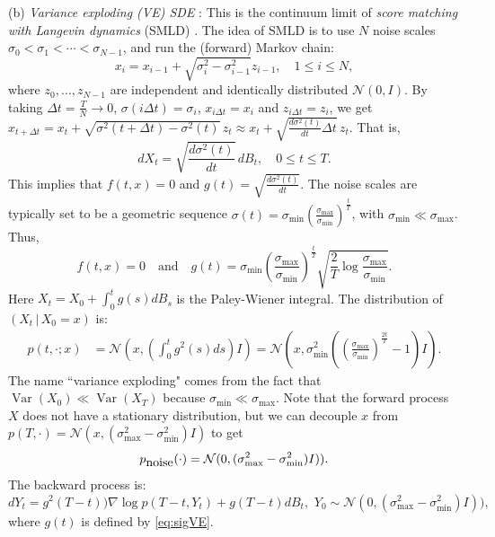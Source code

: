 \documentclass[letterpaper,11pt,reqno]{amsart}
\DeclareMathOperator\var{Var}
\numberwithin{equation}{section}
\begin{document}
\noindent
(b) {\em Variance exploding (VE) SDE} \cite{Song20}: 
This is the continuum limit of {\em score matching with Langevin dynamics} (SMLD) \cite{Song19}.
The idea of SMLD is to use $N$ noise scales $\sigma_0 < \sigma_1 < \cdots < \sigma_{N-1}$, 
and run the (forward) Markov chain:
\begin{equation*}
x_i = x_{i-1} + \sqrt{\sigma_i^2 - \sigma_{i-1}^2} z_{i-1}, \quad 1 \le i \le N,
\end{equation*}
where $z_0, \ldots, z_{N-1}$ are independent and identically distributed $\mathcal{N}(0, I)$.
By taking $\Delta t = \frac{T}{N} \to 0$,  $\sigma(i\Delta t) = \sigma_i$, $x_{i\Delta t} = x_i$ and $z_{i\Delta t} = z_i$,
we get 
$x_{t+\Delta t} = x_t+ \sqrt{\sigma^2(t+\Delta t) - \sigma^2(t)} \, z_t \approx x_t + \sqrt{\frac{d \sigma^2(t)}{dt} \Delta t} \, z_t$.
That is,
\begin{equation*}
dX_t = \sqrt{\frac{d \sigma^2(t)}{dt}} \,  dB_t, \quad 0 \le t \le T.
\end{equation*}
This implies that $f(t,x) = 0$
and $g(t) = \sqrt{\frac{d \sigma^2(t)}{dt}}$.
 The noise scales are typically set to be a geometric sequence
$\sigma(t) = \sigma_{\min} \left( \frac{\sigma_{\max}}{\sigma_{\min}} \right)^{\frac{t}{T}}$,
with $\sigma_{\min} \ll  \sigma_{\max}$.
Thus,
\begin{equation}
\label{eq:sigVE}
f(t,x) = 0 \quad \mbox{and} \quad
g(t) = \sigma_{\min} \left(\frac{\sigma_{\max}}{\sigma_{\min}} \right)^{\frac{t}{T}} \sqrt{\frac{2}{T} \log \frac{\sigma_{\max}}{\sigma_{\min}}}.
\end{equation}
Here $X_t = X_0 + \int_0^t g(s) dB_s$ is the Paley-Wiener integral. 
The distribution of $(X_t \,|\, X_0 = x)$ is:
\begin{equation}
\label{eq:VEp}
\begin{aligned}
p(t, \cdot; x) &= \mathcal{N}\left(x, \left(\int_0^t g^2(s) ds\right) I \right) = \mathcal{N}\left(x, \sigma^2_{\min}\left( \left(\frac{\sigma_{\max}}{\sigma_{\min}} \right)^{\frac{2t}{T}}- 1 \right) I \right).
\end{aligned}
\end{equation}
The name ``variance exploding" comes from the fact that $\var(X_0) \ll \var(X_T)$
because $\sigma_{\min} \ll \sigma_{\max}$.
Note that the forward process $X$ does not have a stationary distribution,
but we can decouple $x$ from $p(T, \cdot) = \mathcal{N}\left(x, (\sigma^2_{\max} - \sigma^2_{\min}) I\right)$ 
to get
\begin{equation*}
p_{\tiny \mbox{noise}}(\cdot) = \mathcal{N}(0,(\sigma^2_{\max} - \sigma^2_{\min}) I)).
\end{equation*}
The backward process is:
\begin{equation}
\label{eq:VErev2}
d Y_t  = g^2(T-t) ) \nabla \log p(T-t, Y_t)+  g(T-t) dB_t,  \,\, Y_0 \sim \mathcal{N}(0,(\sigma^2_{\max} - \sigma^2_{\min}) I)),
\end{equation}
where $g(t)$ is defined by \eqref{eq:sigVE}.
\end{document}
